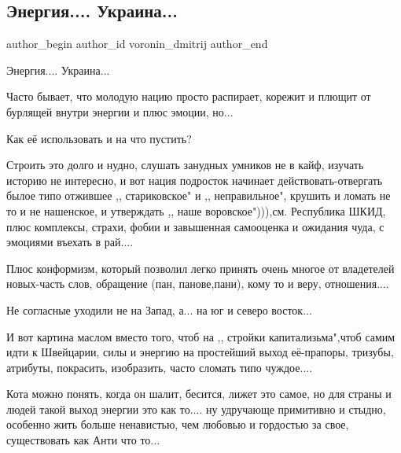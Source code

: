  
 
 
 
 
 
\subsection{Энергия.... Украина...}
\label{sec:25_08_2021.fb.voronin_dmitrij.1.energia_ukraina}
 
\ifcmt
 author_begin
   author_id voronin_dmitrij
 author_end
\fi

Энергия.... Украина...

Часто бывает, что молодую нацию просто распирает, корежит и плющит от бурлящей внутри энергии и плюс эмоции, но...

Как её использовать и на что пустить?

Строить это долго и нудно, слушать занудных умников не в кайф, изучать историю
не интересно, и вот нация подросток начинает действовать-отвергать былое типо
отжившее ,, стариковское" и ,, неправильное", крушить и ломать не то и не
нашенское, и утверждать ,, наше воровское"))),см. Республика ШКИД, плюс комплексы,
страхи, фобии и завышенная самооценка и ожидания чуда, с эмоциями въехать в
рай....

Плюс конформизм, который позволил легко принять очень многое от владетелей
новых-часть слов, обращение (пан, панове,пани), кому то и веру, отношения....

Не согласные уходили не на Запад, а... на юг и северо восток...

И вот картина маслом вместо того, чтоб на ,, стройки капитализьма",чтоб самим
идти к Швейцарии, силы и энергию на простейший выход её-прапоры, тризубы,
атрибуты, покрасить, изобразить, часто сломать типо чуждое....

Кота можно понять, когда он шалит, бесится, лижет это самое, но для страны и
людей такой выход энергии это как то.... ну удручающе примитивно и стыдно,
особенно жить больше ненавистью, чем любовью и гордостью за свое, существовать
как Анти что то...
